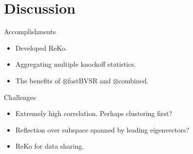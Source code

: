 \documentclass[]{beamer}
\begin{document}
\section{Discussion}
\begin{frame}{Accomplishments}

\begin{itemize}
\item Developed ReKo. 
\item Aggregating multiple knockoff statistics. 
\item The benefits of $\otimes$fastBVSR and $\otimes$combined. 
\end{itemize}
\end{frame}
%
\begin{frame}{Challenges}
\begin{itemize}
\item Extremely high correlation. Perhaps clustering first? 
\item Reflection over subspace spanned by leading eigenvectors?  
\item ReKo for data sharing.  
\end{itemize}

\end{frame}
%
\end{document}
